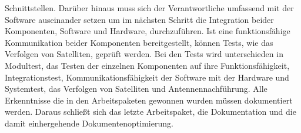Schnittstellen. Darüber hinaus muss sich der Verantwortliche umfassend mit der Software auseinander setzen um im nächsten Schritt die Integration 
beider Komponenten, Software und Hardware, durchzuführen. Ist eine funktionsfähige Kommunikation beider Komponenten bereitgestellt, können Tests, wie 
das Verfolgen von Satelliten, geprüft werden. Bei den Tests wird unterschieden in Modultest, das Testen der einzelnen Komponenten auf ihre 
Funktionsfähigkeit, Integrationstest, Kommunikationsfähigkeit der Software mit der Hardware und Systemtest, das Verfolgen von Satelliten und 
Antennennachführung. Alle Erkenntnisse die in den Arbeitspaketen gewonnen wurden müssen dokumentiert werden. Daraus schließt sich das letzte 
Arbeitspaket, die Dokumentation und die damit einhergehende Dokumentenoptimierung.